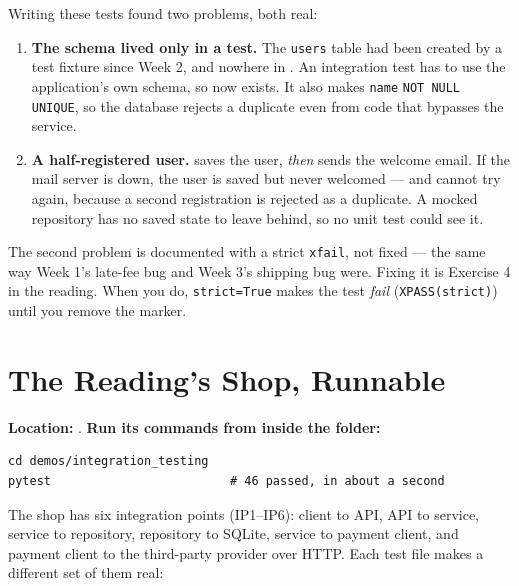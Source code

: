 \documentclass[11pt]{article}
\begin{document}
Writing these tests found two problems, both real:
\begin{enumerate}
\item \textbf{The schema lived only in a test.} The \texttt{users} table
had been created by a test fixture since Week 2, and nowhere in
. An integration test has to use the application's own
schema, so  now exists. It also makes
\texttt{name} \texttt{NOT NULL UNIQUE}, so the database rejects a
duplicate even from code that bypasses the service.
\item \textbf{A half-registered user.}  saves the user,
\emph{then} sends the welcome email. If the mail server is down, the user
is saved but never welcomed --- and cannot try again, because a second
registration is rejected as a duplicate. A mocked repository has no
saved state to leave behind, so no unit test could see it.
\end{enumerate}

\begin{warningbox}
The second problem is documented with a strict \texttt{xfail}, not
fixed --- the same way Week 1's late-fee bug and Week 3's shipping bug
were. Fixing it is Exercise 4 in the reading. When you do,
\texttt{strict=True} makes the test \emph{fail} (\texttt{XPASS(strict)})
until you remove the marker.
\end{warningbox}

\section{The Reading's Shop, Runnable}
\textbf{Location:} . \textbf{Run its
commands from inside the folder:}
\begin{lstlisting}[style=shellstyle]
cd demos/integration_testing
pytest                         # 46 passed, in about a second
\end{lstlisting}

The shop has six integration points (IP1--IP6): client to API, API to
service, service to repository, repository to SQLite, service to payment
client, and payment client to the third-party provider over HTTP. Each
test file makes a different set of them real:
\end{document}
